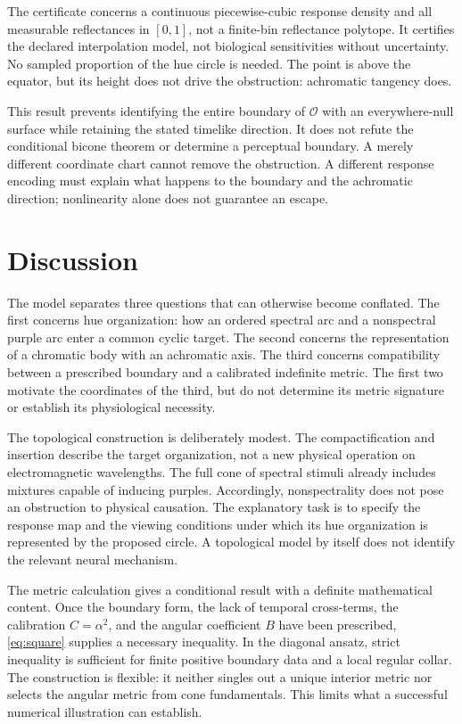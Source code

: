 \documentclass[9pt,twocolumn,twoside]{opticajnl}
\theoremstyle{plain}
\begin{document}
The certificate concerns a continuous piecewise-cubic response density and all measurable reflectances in $[0,1]$, not a finite-bin reflectance polytope. It certifies the declared interpolation model, not biological sensitivities without uncertainty. No sampled proportion of the hue circle is needed. The point is above the equator, but its height does not drive the obstruction: achromatic tangency does.

This result prevents identifying the entire boundary of $\mathcal O$ with an everywhere-null surface while retaining the stated timelike direction. It does not refute the conditional bicone theorem or determine a perceptual boundary. A merely different coordinate chart cannot remove the obstruction. A different response encoding must explain what happens to the boundary and the achromatic direction; nonlinearity alone does not guarantee an escape.

\section{Discussion}
\label{sec:discussion}
The model separates three questions that can otherwise become conflated. The first concerns hue organization: how an ordered spectral arc and a nonspectral purple arc enter a common cyclic target. The second concerns the representation of a chromatic body with an achromatic axis. The third concerns compatibility between a prescribed boundary and a calibrated indefinite metric. The first two motivate the coordinates of the third, but do not determine its metric signature or establish its physiological necessity.

The topological construction is deliberately modest. The compactification and insertion describe the target organization, not a new physical operation on electromagnetic wavelengths. The full cone of spectral stimuli already includes mixtures capable of inducing purples. Accordingly, nonspectrality does not pose an obstruction to physical causation. The explanatory task is to specify the response map and the viewing conditions under which its hue organization is represented by the proposed circle. A topological model by itself does not identify the relevant neural mechanism.

The metric calculation gives a conditional result with a definite mathematical content. Once the boundary form, the lack of temporal cross-terms, the calibration $C=\alpha^2$, and the angular coefficient $B$ have been prescribed, \eqref{eq:square} supplies a necessary inequality. In the diagonal ansatz, strict inequality is sufficient for finite positive boundary data and a local regular collar. The construction is flexible: it neither singles out a unique interior metric nor selects the angular metric from cone fundamentals. This limits what a successful numerical illustration can establish.
\end{document}

